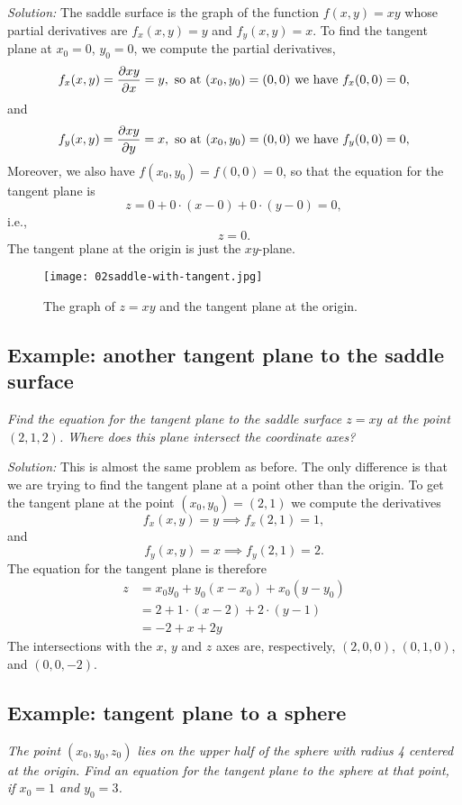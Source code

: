 \textit{Solution: } The saddle surface is the graph of the function $f(x, y) =
xy$ whose partial derivatives are $f_x(x, y) = y$ and $f_y(x,y) = x$.  To find
the tangent plane at $x_0=0$, $y_0=0$, we compute the partial derivatives,
\[
f_x(x, y) = \frac{\partial xy}{\partial x} = y, \text{ so at $(x_0,y_0) = (0,0)$ we have } f_x(0,0) =
0,
\]
and
\[
f_y(x, y) = \frac{\partial xy}{\partial y} = x, \text{ so at $(x_0,y_0) = (0,0)$ we have } f_y(0,0) =
0,
\]
Moreover, we also have $f(x_0,y_0) = f(0,0) = 0$, so that the equation for the
tangent plane is
\[
z= 0 + 0\cdot(x-0) + 0\cdot(y-0) = 0,
\]
i.e.,
\[
z=0.
\]
The tangent plane at the origin is just the $xy$-plane.

\begin{figure}
  \centering
  \texttt{[image: 02saddle-with-tangent.jpg]}
  \caption{The graph of $z=xy$ and the tangent plane at the origin. }
  \label{fig:saddle-with-tangent}
\end{figure}

\subsection{Example: another tangent plane to the saddle surface}
\label{sec:another-tangent-to-the-saddle}%
\textit{Find the equation for the tangent plane to the saddle surface $z=xy$ at
  the point $(2,1,2)$.  Where does this plane intersect the coordinate axes?}

\textit{Solution: } This is almost the same problem as before.  The only
difference is that we are trying to find the tangent plane at a point other than
the origin.  To get the tangent plane at the point $(x_0,y_0) = (2,1)$ we
compute the derivatives
\[
f_x(x,y) = y \implies f_x(2,1) = 1,
\]
and
\[
f_y(x, y) = x \implies f_y(2,1) = 2.
\]
The equation for the tangent plane is therefore
\begin{align}
  \label{eq:tangent-to-saddle}
  z &= x_0y_0 + y_0(x-x_0) + x_0(y-y_0)\\
  &= 2+1\cdot(x-2)+2\cdot(y-1) \nonumber\\
  &= -2 +x +2y \nonumber
\end{align}
The intersections with the $x$, $y$ and $z$ axes are, respectively, $(2,0,0)$,
$(0,1,0)$, and $(0,0,-2)$.

\subsection{Example: tangent plane to a sphere}
\label{sec:tangent-plane-to-sphere-as-graph}%
\textit{The point $(x_0, y_0, z_0)$ lies on the upper half of the sphere with
  radius 4 centered at the origin.  Find an equation for the tangent plane to
  the sphere at that point, if $x_0 = 1$ and $y_0=3$.}

